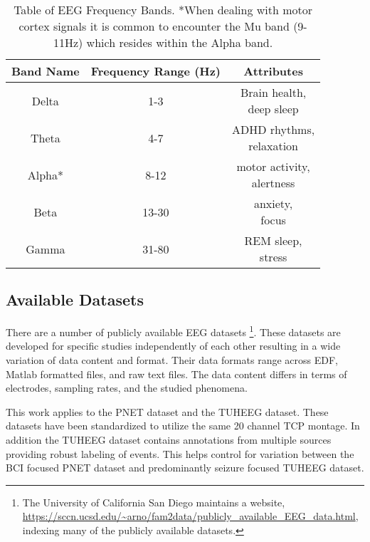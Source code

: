 \begin{table}[ht]
\caption[EEG Frequency Bands]{Table of EEG Frequency Bands. *When dealing with motor cortex signals it is common to encounter the Mu band (9-11Hz) which resides within the Alpha band.}
\centering
\begin{tabular}{ c c c }
\toprule
Band Name & Frequency Range (Hz) & Attributes \\
\midrule
Delta & 1-3 & \makecell{Brain health,\\deep sleep} \\
Theta & 4-7 & \makecell{ADHD rhythms,\\relaxation} \\
Alpha* & 8-12 & \makecell{motor activity,\\alertness} \\
Beta & 13-30 & \makecell{anxiety,\\focus} \\
Gamma & 31-80 & \makecell{REM sleep,\\stress} \\
\bottomrule
\end{tabular}
\label{tab:eeg_band}
\end{table}

\subsection{Available Datasets}

There are a number of publicly available \ac{EEG} datasets \footnote{The University of California San Diego maintains a website, \url{https://sccn.ucsd.edu/~arno/fam2data/publicly_available_EEG_data.html}, indexing many of the publicly available datasets.}. These datasets are developed for specific studies independently of each other resulting in a wide variation of data content and format. Their data formats range across \ac{EDF}, Matlab formatted files, and raw text files. The data content differs in terms of electrodes, sampling rates, and the studied phenomena.

This work applies to the \ac{PNET} dataset and the \ac{TUHEEG} dataset. These datasets have been standardized to utilize the same 20 channel \ac{TCP} montage. In addition the \ac{TUHEEG} dataset contains annotations from multiple sources providing robust labeling of events. This helps control for variation between the \ac{BCI} focused \ac{PNET} dataset and predominantly seizure focused \ac{TUHEEG} dataset.

